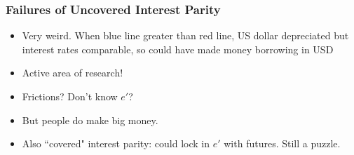 \documentclass{beamer}
\begin{document}
\begin{frame}
\frametitle[alignment=center]{Failures of Uncovered Interest Parity }
\begin{itemize}
\item Very weird.  When blue line greater than red line, US dollar depreciated but interest rates comparable, so could have made money borrowing in USD
\bigskip
\item Active area of research!
\bigskip
\item Frictions?  Don't know $e'$?
\bigskip
\item But people do make big money.
\bigskip
\item Also ``covered" interest parity:  could lock in $e'$ with futures.  Still a puzzle.
\end{itemize}
\end{frame}
\end{document}
